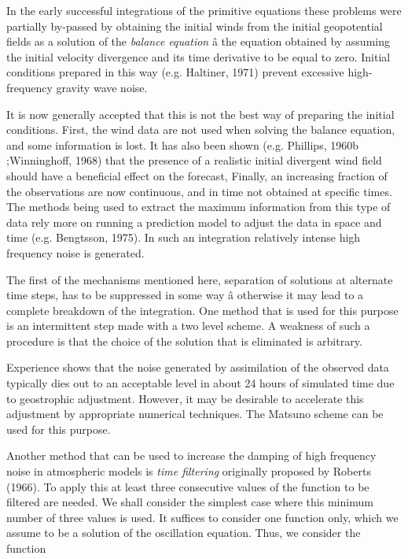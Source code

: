 In the early successful integrations of the primitive equations these
problems were partially by-passed by obtaining the initial winds from
the initial geopotential fields as a solution of the \emph{balance
equation} â the equation obtained by assuming the initial velocity
divergence and its time derivative to be equal to zero. Initial
conditions prepared in this way (e.g. Haltiner, 1971) prevent excessive
high-frequency gravity wave noise.

It is now generally accepted that this is not the best way of preparing
the initial conditions. First, the wind data are not used when solving
the balance equation, and some information is lost. It has also been
shown (e.g. Phillips, 1960b ;Winninghoff, 1968) that the presence of a
realistic initial divergent wind field should have a beneficial effect
on the forecast, Finally, an increasing fraction of the observations are
now continuous, and in time not obtained at specific times. The methods
being used to extract the maximum information from this type of data
rely more on running a prediction model to adjust the data in space and
time (e.g. Bengtsson, 1975). In such an integration relatively intense
high frequency noise is generated.

The first of the mechanisms mentioned here, separation of solutions at
alternate time steps, has to be suppressed in some way â otherwise it
may lead to a complete breakdown of the integration. One method that is
used for this purpose is an intermittent step made with a two level
scheme. A weakness of such a procedure is that the choice of the
solution that is eliminated is arbitrary.

Experience shows that the noise generated by assimilation of the
observed data typically dies out to an acceptable level in about 24
hours of simulated time due to geostrophic adjustment. However, it may
be desirable to accelerate this adjustment by appropriate numerical
techniques. The Matsuno scheme can be used for this purpose.

Another method that can be used to increase the damping of high
frequency noise in atmospheric models is \emph{time filtering}
originally proposed by Roberts (1966). To apply this at least three
consecutive values of the function to be filtered are needed. We shall
consider the simplest case where this minimum number of three values is
used. It suffices to consider one function only, which we assume to be a
solution of the oscillation equation. Thus, we consider the function

